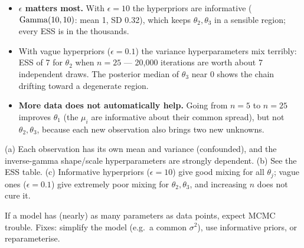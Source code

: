 \documentclass[11pt]{article}
\begin{document}
\begin{itemize}
\item \textbf{$\epsilon$ matters most.} With $\epsilon=10$ the hyperpriors are informative ($\mathrm{Gamma}(10,10)$: mean 1, SD 0.32), which keeps $\theta_2,\theta_3$ in a sensible region; every ESS is in the thousands.
\item With vague hyperpriors ($\epsilon=0.1$) the variance hyperparameters mix terribly: ESS of 7 for $\theta_2$ when $n=25$ --- 20{,}000 iterations are worth about 7 independent draws. The posterior median of $\theta_3$ near 0 shows the chain drifting toward a degenerate region.
\item \textbf{More data does not automatically help.} Going from $n=5$ to $n=25$ improves $\theta_1$ (the $\mu_i$ are informative about their common spread), but not $\theta_2,\theta_3$, because each new observation also brings two new unknowns.
\end{itemize}

\begin{answer}
(a) Each observation has its own mean and variance (confounded), and the inverse-gamma shape/scale hyperparameters are strongly dependent. (b) See the ESS table. (c) Informative hyperpriors ($\epsilon=10$) give good mixing for all $\theta_j$; vague ones ($\epsilon=0.1$) give extremely poor mixing for $\theta_2,\theta_3$, and increasing $n$ does not cure it.
\end{answer}

\begin{takeaway}
If a model has (nearly) as many parameters as data points, expect MCMC trouble. Fixes: simplify the model (e.g.\ a common $\sigma^2$), use informative priors, or reparameterise.
\end{takeaway}
\end{document}
